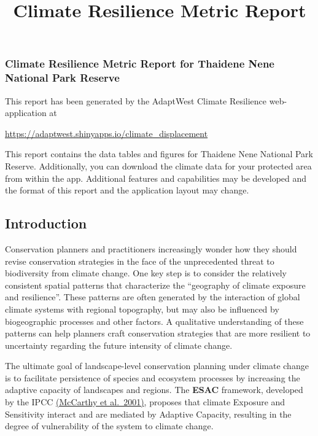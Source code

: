 \documentclass[
]{article}
\title{Climate Resilience Metric Report}
\author{}
\date{\vspace{-2.5em}}
\begin{document}
\maketitle

\hypertarget{climate-resilience-metric-report-for-thaidene-nene-national-park-reserve}{%
\subsubsection{Climate Resilience Metric Report for Thaidene Nene
National Park
Reserve}\label{climate-resilience-metric-report-for-thaidene-nene-national-park-reserve}}

This report has been generated by the AdaptWest Climate Resilience
web-application at

\url{https://adaptwest.shinyapps.io/climate_displacement}

This report contains the data tables and figures for Thaidene Nene
National Park Reserve. Additionally, you can download the climate data
for your protected area from within the app. Additional features and
capabilities may be developed and the format of this report and the
application layout may change.

\hypertarget{introduction}{%
\subsection{Introduction}\label{introduction}}

Conservation planners and practitioners increasingly wonder how they
should revise conservation strategies in the face of the unprecedented
threat to biodiversity from climate change. One key step is to consider
the relatively consistent spatial patterns that characterize the
``geography of climate exposure and resilience''. These patterns are
often generated by the interaction of global climate systems with
regional topography, but may also be influenced by biogeographic
processes and other factors. A qualitative understanding of these
patterns can help planners craft conservation strategies that are more
resilient to uncertainty regarding the future intensity of climate
change.

The ultimate goal of landscape-level conservation planning under climate
change is to facilitate persistence of species and ecosystem processes
by increasing the adaptive capacity of landscapes and regions. The
\textbf{ESAC} framework, developed by the IPCC
\href{https://www.ipcc.ch/ipccreports/tar/wg2/pdf/wg2TARfrontmatter.pdf}{(McCarthy
et al.~2001)}, proposes that climate Exposure and Sensitivity interact
and are mediated by Adaptive Capacity, resulting in the degree of
vulnerability of the system to climate change.
\end{document}

